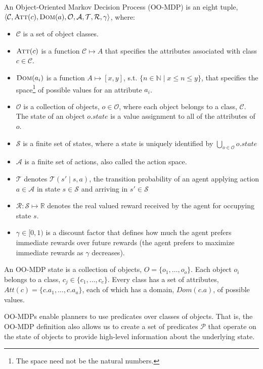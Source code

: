 \documentclass[11pt]{article}
\begin{document}
{ An \textup{Object-Oriented Markov Decision Process (OO-MDP)} is an eight tuple, $\langle \mathcal{C}, \textsc{Att}(c), \textsc{Dom}(a), \mathcal{O},
\mathcal{A}, \mathcal{T}, \mathcal{R}, \gamma \rangle$, where:

\begin{itemize}
\item $\mathcal{C}$ is a set of object classes.
\item $\textsc{Att}(c)$ is a function $\mathcal{C} \mapsto A$ that specifies the attributes associated with class $c \in \mathcal{C}$.
\item $\textsc{Dom}(a_i)$ is a function $A \mapsto [x,y]$, s.t. $\{n \in \mathbb{N} \mid x \leq n \leq y \}$, that specifies the space\footnote{The space need not be the natural numbers.}  of possible values for an attribute $a_i$.
\item $\mathcal{O}$ is a collection of objects, $o \in \mathcal{O}$, where each object belongs to a class, $\mathcal{C}$. The \textup{state} of an object $o.state$ is a value assignment to all of the attributes of $o$.
\item $\mathcal{S}$ is a finite set of states, where a state is uniquely identified by $\bigcup_{o \in \mathcal{O}} o.state$
\item $\mathcal{A}$ is a finite set of actions, also called the \textup{action space}.
\item $\mathcal{T}$ denotes $\mathcal{T}(s' \mid s,a)$, the
transition probability of an agent applying action $a \in \mathcal{A}$
in state $s \in \mathcal{S}$ and arriving in $s' \in \mathcal{S}$
\item $\mathcal{R} : \mathcal{S} \mapsto \mathbb{R}$ denotes the real valued reward received by the agent for
occupying state $s$.
\item $\gamma \in [0, 1)$ is a discount factor that defines how much the
  agent prefers immediate rewards over future rewards (the agent
  prefers to maximize immediate rewards as $\gamma$ decreases).
\end{itemize}}

An OO-MDP state is a collection of objects, $O = \{o_1, \ldots, o_o \}$.  Each object
$o_i$ belongs to a class, $c_j \in \{c_1, \ldots, c_c\}$. Every class
has a set of attributes, $Att(c) = \{c.a_1, \ldots, c.a_a \}$, each of
which has a domain, $Dom(c.a)$, of possible values. 

OO-MDPs enable planners to use predicates over classes of objects. That is, the
OO-MDP definition also allows us to create a set of predicates $\mathcal{P}$ that
operate on the state of objects to provide high-level
information about the underlying state.
\end{document}
